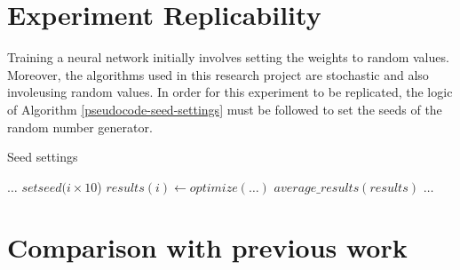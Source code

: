 \documentclass[a4paper,12pt, oneside]{memoir}
\begin{document}
\section{Experiment Replicability}

Training a neural network initially involves setting the weights to random values. Moreover, the algorithms used in this research project are stochastic and also involeusing random values. In order for this experiment to be replicated, the logic of Algorithm \ref{pseudocode-seed-settings} must be followed to set the seeds of the random number generator.

\begin{algorithm}[H]\small
  \caption{Seed settings}\label{pseudocode-seed-settings}
  \begin{algorithmic}[1]
    \State $\dots$
      \State $set seed(i \times 10$)
      \State $results(i) \gets optimize(\dots)$
    \EndFor
    \State $average\_results(results)$
    \State $\dots$
  \end{algorithmic}
\end{algorithm}

\newpage

\section{Comparison with previous work}
\end{document}
